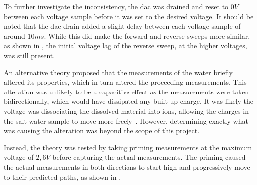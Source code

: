 To further investigate the inconsistency, the \gls{dac} was drained and reset to $0V$ between each voltage sample before it was set to the desired voltage.
It should be noted that the \gls{dac} drain added a slight delay between each voltage sample of around $10ms$. 
While this did make the forward and reverse sweeps more similar, as shown in , the initial voltage lag of the reverse sweep, at the higher voltages, was still present.

An alternative theory proposed that the measurements of the water briefly altered its properties, which in turn altered the proceeding measurements.
This alteration was unlikely to be a capacitive effect as the measurements were taken bidirectionally, which would have dissipated any built-up charge.
It was likely the voltage was dissociating the dissolved material into ions, allowing the charges in the salt water sample to move more freely~\cite{ostdiek_inquiry_into_physics_2020}.
However, determining exactly what was causing the alteration was beyond the scope of this project.

Instead, the theory was tested by taking priming measurements at the maximum voltage of $2,6V$ before capturing the actual measurements.
The priming caused the actual measurements in both directions to start high and progressively move to their predicted paths, as shown in .

